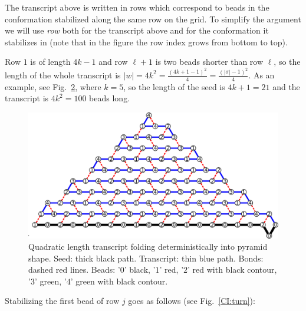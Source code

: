 \begin{figure}[h]
\begin{minipage}{.49\textwidth}
	\end{minipage}
	\caption{}
	\label{table:transcript}
\end{figure}

The transcript above is written in rows which correspond to beads in the conformation stabilized along the same row on the grid. To simplify the argument we will use \textit{row} both for the transcript above and for the conformation it stabilizes in (note that in the figure the row index grows from bottom to top). 

Row $1$ is of length $4k-1$ and row $\ell+1$ is two beads shorter than row $\ell$, so the length of the whole transcript is $|w|=4k^2=\frac{(4k+1-1)^2}{4}=\frac{(|\sigma|-1)^2}{4}$. As an example, see Fig.~\ref{CI:big}, where $k=5$, so the length of the seed is $4k+1=21$ and the transcript is $4k^2 = 100$ beads long.

\begin{figure}
	\centering
	\includegraphics[width=0.9\linewidth]{./Fig/chichenBig}
	\caption{Quadratic length transcript folding deterministically into pyramid shape. Seed: thick black path. Transcript: thin blue path. Bonds: dashed red lines. Beads: '$0$' black, '$1$' red, '$2$' red with black contour, '$3$' green, '$4$' green with black contour.}
	\label{CI:big}
\end{figure}


Stabilizing the first bead of row $j$ goes as follows (see Fig.~\ref{CI:turn}):

